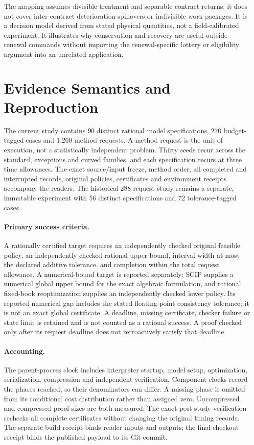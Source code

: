 \documentclass[11pt,letterpaper]{article}
\theoremstyle{definition}\newtheorem{remark}[theorem]{Remark}
\begin{document}
The mapping assumes divisible treatment and separable contract returns; it does not cover inter-contract deterioration spillovers or indivisible work packages. It is a decision model derived from stated physical quantities, not a field-calibrated experiment. It illustrates why conservation and recovery are useful outside renewal commands without importing the renewal-specific lottery or eligibility argument into an unrelated application.
\section{Evidence Semantics and Reproduction}\label{sec:evidence60}
The current study contains 90 distinct rational model specifications, 270 budget-tagged cases and 1,260 method requests. A method request is the unit of execution, not a statistically independent problem. Thirty seeds recur across the standard, exceptions and curved families, and each specification recurs at three time allowances. The exact source/input freeze, method order, all completed and interrupted records, original policies, certificates and environment receipts accompany the readers. The historical 288-request study remains a separate, immutable experiment with 56 distinct specifications and 72 tolerance-tagged cases.

\paragraph{Primary success criteria.} A rationally certified target requires an independently checked original feasible policy, an independently checked rational upper bound, interval width at most the declared additive tolerance, and completion within the total request allowance. A numerical-bound target is reported separately: SCIP supplies a numerical global upper bound for the exact algebraic formulation, and rational fixed-book reoptimization supplies an independently checked lower policy. Its reported numerical gap includes the stated floating-point consistency tolerance; it is not an exact global certificate. A deadline, missing certificate, checker failure or state limit is retained and is not counted as a rational success. A proof checked only after its request deadline does not retroactively satisfy that deadline.

\paragraph{Accounting.} The parent-process clock includes interpreter startup, model setup, optimization, serialization, compression and independent verification. Component clocks record the phases reached, so their denominators can differ. A missing phase is omitted from its conditional cost distribution rather than assigned zero. Uncompressed and compressed proof sizes are both measured. The exact post-study verification rechecks all complete certificates without changing the original timing records. The separate build receipt binds reader inputs and outputs; the final checkout receipt binds the published payload to its Git commit.
\end{document}

